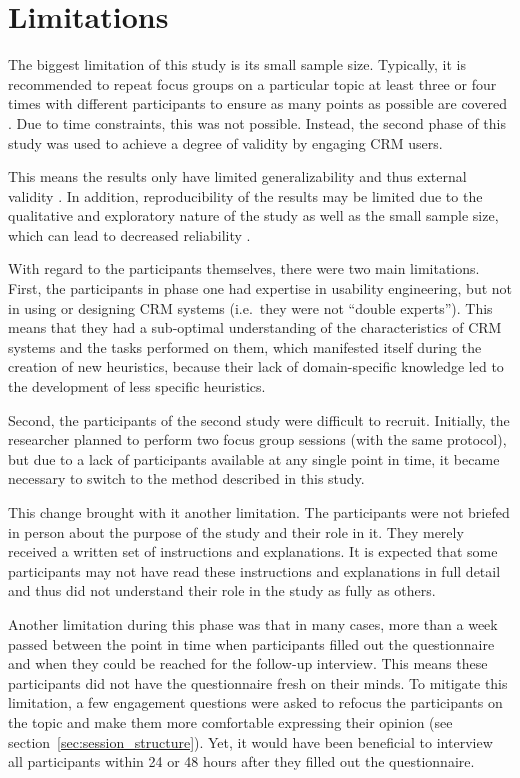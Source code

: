 \section{Limitations}
\label{sec:limitations}
The biggest limitation of this study is its small sample size. Typically, it is recommended to repeat focus groups on a particular topic at least three or four times with different participants to ensure as many points as possible are covered \citep{Edmunds1999,Morgan1998}. Due to time constraints, this was not possible. Instead, the second phase of this study was used to achieve a degree of validity by engaging CRM users.

This means the results only have limited generalizability and thus external validity \citep[p.\ 158]{Creswell1994}. In addition, reproducibility of the results may be limited due to the qualitative and exploratory nature of the study as well as the small sample size, which can lead to decreased reliability \citep[p.\ 159]{Creswell1994}.

With regard to the participants themselves, there were two main limitations. First, the participants in phase one had expertise in usability engineering, but not in using or designing CRM systems (i.e.\ they were not ``double experts''). This means that they had a sub-optimal understanding of the characteristics of CRM systems and the tasks performed on them, which manifested itself during the creation of new heuristics, because their lack of domain-specific knowledge led to the development of less specific heuristics.

Second, the participants of the second study were difficult to recruit. Initially, the researcher planned to perform two focus group sessions (with the same protocol), but due to a lack of participants available at any single point in time, it became necessary to switch to the method described in this study.

This change brought with it another limitation. The participants were not briefed in person about the purpose of the study and their role in it. They merely received a written set of instructions and explanations. It is expected that some participants may not have read these instructions and explanations in full detail and thus did not understand their role in the study as fully as others.

Another limitation during this phase was that in many cases, more than a week passed between the point in time when participants filled out the questionnaire and when they could be reached for the follow-up interview. This means these participants did not have the questionnaire fresh on their minds. To mitigate this limitation, a few engagement questions were asked to refocus the participants on the topic and make them more comfortable expressing their opinion (see section~\ref{sec:session_structure}). Yet, it would have been beneficial to interview all participants within 24 or 48 hours after they filled out the questionnaire.

